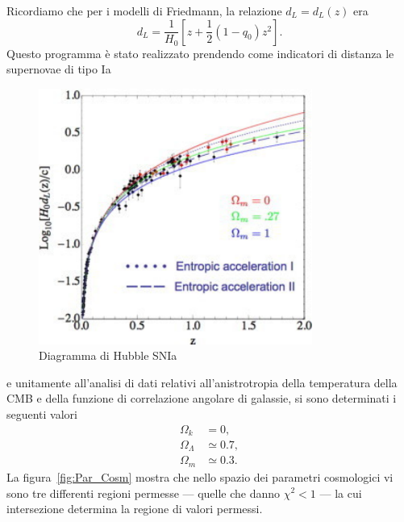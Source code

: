 Ricordiamo che per i modelli di Friedmann, la relazione $d_L=d_L(z)$ era
\begin{equation}
  d_L = \frac {1}{H_0} \left[ z+ \frac{1}{2}(1-q_0)z^2\right].
\end{equation}
Questo programma è stato realizzato prendendo come indicatori di distanza le
supernovae di tipo Ia~\parencites{1998AJ....116.1009R}{1999ApJ...517..565P}
\begin{figure}
  \centering
  \includegraphics[width=0.8\textwidth]{figure/Hubble_Diagr_1_SNIa.pdf}
  \caption{Diagramma di Hubble SNIa}
  \label{fig:DHSN1}
\end{figure}
e unitamente all'analisi di dati relativi all'anistrotropia della temperatura
della CMB e della funzione di correlazione angolare di galassie, si sono
determinati i seguenti valori
\begin{subequations}
  \begin{align}
    \Omega_k &= 0, \\
    \Omega_{\Lambda} &\simeq 0.7, \\
    \Omega_{m} &\simeq 0.3.
  \end{align}
\end{subequations}
La figura~\ref{fig:Par_Cosm} mostra che nello spazio dei parametri cosmologici
vi sono tre differenti regioni permesse --- quelle che danno $\chi^2<1$ --- la
cui intersezione determina la regione di valori permessi.
